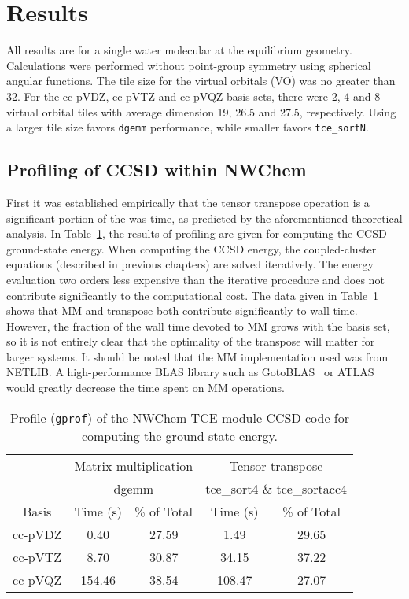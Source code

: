 \documentclass[letterpaper,12pt]{article}
\begin{document}
\section{Results}

All results are for a single water molecular at the equilibrium geometry.  Calculations were performed without point-group symmetry using spherical angular functions.  The tile size for the virtual orbitals (VO) was no greater than 32.  For the cc-pVDZ, cc-pVTZ and cc-pVQZ basis sets, there were 2, 4 and 8 virtual orbital tiles with average dimension 19, 26.5 and 27.5, respectively.  Using a larger tile size favors \texttt{dgemm} performance, while smaller favors \texttt{tce\_sortN}.

\subsection{Profiling of CCSD within NWChem}

First it was established empirically that the tensor transpose operation is a significant portion of the was time, as predicted by the aforementioned theoretical analysis.  In Table~\ref{tab:profile1}, the results of profiling are given for computing the CCSD ground-state energy.  When computing the CCSD energy, the coupled-cluster equations (described in previous chapters) are solved iteratively.  The energy evaluation two orders less expensive than the iterative procedure and does not contribute significantly to the computational cost.  The data given in Table~\ref{tab:profile1} shows that MM and transpose both contribute significantly to wall time.  However, the fraction of the wall time devoted to MM grows with the basis set, so it is not entirely clear that the optimality of the transpose will matter for larger systems.  It should be noted that the MM implementation used was from NETLIB.  A high-performance BLAS library such as GotoBLAS~\cite{GotoBLAS} or ATLAS~\cite{ATLAS} would greatly decrease the time spent on MM operations.

\begin{table}
\caption{Profile (\texttt{gprof}) of the NWChem TCE module CCSD code for computing the ground-state energy.} \label{tab:profile1}
\begin{center}
\begin{tabular}{ccccc}
\hline\hline
& \multicolumn{2}{c}{Matrix multiplication} & \multicolumn{2}{c}{Tensor transpose} \\
 & \multicolumn{2}{c}{dgemm} & \multicolumn{2}{c}{tce\_sort4 \& tce\_sortacc4} \\
   \cline{2-3} \cline{4-5}
Basis & Time (s) & \% of Total & Time (s) & \% of Total \\
\hline
cc-pVDZ &   0.40 & 27.59 &   1.49 & 29.65 \\
cc-pVTZ &   8.70 & 30.87 &  34.15 & 37.22 \\
cc-pVQZ & 154.46 & 38.54 & 108.47 & 27.07 \\
\hline\hline
\end{tabular}
\end{center}
\end{table}
\end{document}
